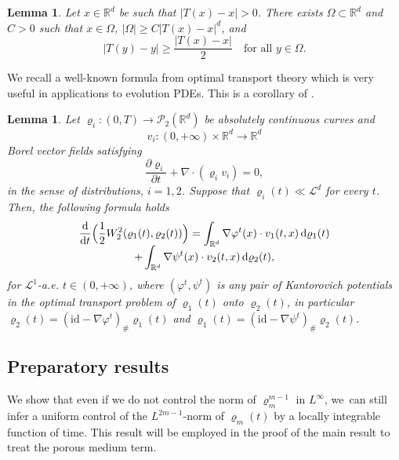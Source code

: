 \documentclass[JEP,XML,SOM,Unicode,published]{cedram}
\newcommand{\Bprt}[1]{\Bigl(#1\Bigr)}
\newcommand{\curlyL}{\mathcal{L}}
\newcommand{\partialt}[1]{\dfrac{\partial#1}{\partial t}}
\newcommand{\dx}[1]{\mathop{}\!\mathrm{d} #1}
\newcommand{\ddt}{\frac{\dx{}}{\dx{t}}}
\newcommand{\R}{\mathbb{R}}
\theoremstyle{plain}
\newtheorem{lemma}[theorem]{Lemma}
\theoremstyle{remark}
\begin{document}
\begin{lemma}\label{lemma 1}
Let $x\in \R^d$ be such that $|T(x)-x|>0$. There exists $\Omega\subset\R^d$ and $C>0$ such that $x\in \Omega$, $|\Omega|\geq C |T(x)-x|^d$, and
\begin{equation*}
|T(y)-y|\geq \frac{|T(x)-x|}{2} \quad \text{for all } y\in \Omega.
\end{equation*}
\end{lemma}

We recall a well-known formula from optimal transport theory which is very useful in applications to evolution PDEs. This is a corollary of \cite[Th.\,8.4.7]{AGS2008}.
\begin{lemma}
Let $\varrho_i : (0,T)\to\mathcal{P}_2(\R^d)$ be absolutely continuous curves and
\[
v_i: (0,+\infty) \times \R^d \to \R^d
\]
Borel vector fields satisfying
\begin{equation*}
\partialt{\varrho_i} +\nabla\cdot(\varrho_i v_i)=0,
\end{equation*}
in the sense of distributions, $i=1,2$. Suppose that $\varrho_i(t) \ll \curlyL^d$ for every $t$.
Then, the following formula holds
\begin{multline}\label{recall_ dt W_2}
\ddt \Bprt{\frac 12 W_2^2(\varrho_1(t), \varrho_2(t))} = \int_{\R^d} \nabla \varphi^t(x) \cdot v_1(t,x) \dx{\varrho_1(t)}\\[-5pt]
+ \int_{\R^d} \nabla \psi^t(x) \cdot v_2(t,x) \dx{\varrho_2(t)},
\end{multline}
for $\mathcal{L}^1$-a.e. $t\in (0,+\infty)$, where $(\varphi^t,\psi^t)$ is any pair of Kantorovich potentials in the optimal transport problem of $\varrho_1(t)$ onto $\varrho_2(t)$, in particular $\varrho_2(t) = (\mathrm{id} - \nabla\varphi^t)_\#\varrho_1(t)$ and $\varrho_1(t) = (\mathrm{id} - \nabla\psi^t)_\#\varrho_2(t).$
\end{lemma}

\subsection{Preparatory results}

We show that even if we do not control the norm of $\varrho_m^{m-1}$ in $L^\infty$, we~can still infer a uniform control of the $L^{2m-1}$-norm of $\varrho_m(t)$ by a locally integrable function of time. This result will be employed in the proof of the main result to treat the porous medium term.
\end{document}
